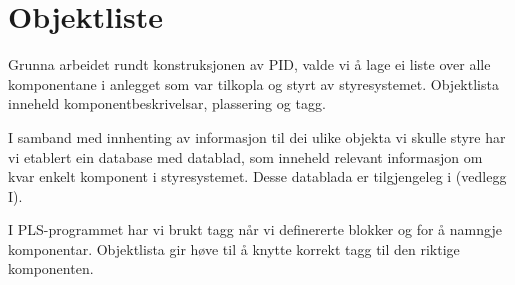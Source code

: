 \section{Objektliste}
\thispagestyle{fancy}

Grunna arbeidet rundt konstruksjonen av \gls{PID}, valde vi å lage ei liste over alle komponentane i anlegget som var tilkopla og styrt av styresystemet.
Objektlista inneheld komponentbeskrivelsar, plassering og tagg. 

I samband med innhenting av informasjon til dei ulike objekta vi skulle styre har vi etablert ein database med datablad,
som inneheld relevant informasjon om kvar enkelt komponent i styresystemet.\newline
Desse datablada er tilgjengeleg i (vedlegg I). 

I \gls{PLS}-programmet har vi brukt tagg når vi definererte blokker og for å namngje komponentar.\newline
Objektlista gir høve til å knytte korrekt tagg til den riktige komponenten.



\newpage

